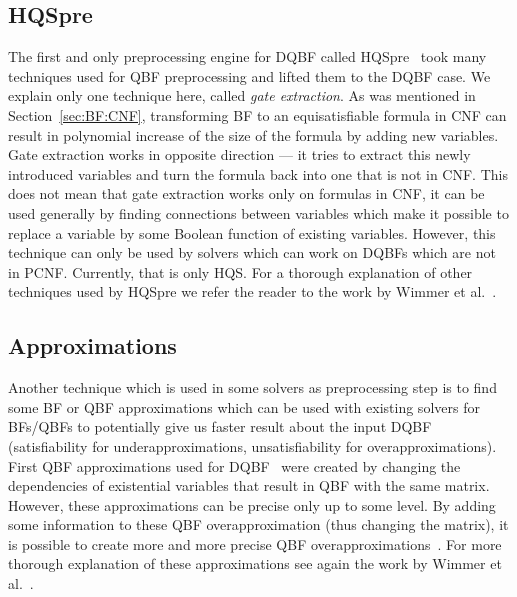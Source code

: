 \documentclass[
  digital, %
  color,
  twoside, %
  table,   %
  nolof,     %
  nolot,     %
]{fithesis3}
\theoremstyle{definition}
\theoremstyle{remark}
\begin{document}
\subsection{HQSpre}
\label{sec:HQSpre}
The first and only preprocessing engine for DQBF called HQSpre~\cite{HQSpre1,HQSpre2,HQSpreJournal} took many techniques used for QBF preprocessing and lifted them to the DQBF case. We explain only one technique here, called \emph{gate extraction}. As was mentioned in Section~\ref{sec:BF:CNF}, transforming BF to an equisatisfiable formula in CNF can result in polynomial increase of the size of the formula by adding new variables. Gate extraction works in opposite direction --- it tries to extract this newly introduced variables and turn the formula back into one that is not in CNF. This does not mean that gate extraction works only on formulas in CNF, it can be used generally by finding connections between variables which make it possible to replace a variable by some Boolean function of existing variables. However, this technique can only be used by solvers which can work on DQBFs which are not in PCNF. Currently, that is only HQS. For a thorough explanation of other techniques used by HQSpre we refer the reader to the work by Wimmer et al.~\cite{HQSpreJournal}. 

\subsection{Approximations}
\label{sec:prepro:approximations}
Another technique which is used in some solvers as preprocessing step is to find some BF or QBF approximations which can be used with existing solvers for BFs/QBFs to potentially give us faster result about the input DQBF (satisfiability for underapproximations, unsatisfiability for overapproximations). First QBF approximations used for DQBF~\cite{HQSsimpleAlg} were created by changing the dependencies of existential variables that result in QBF with the same matrix. However, these approximations can be precise only up to some level. By adding some information to these QBF overapproximation (thus changing the matrix), it is possible to create more and more precise QBF overapproximations~\cite{FastDQBFRefutation}. For more thorough explanation of these approximations see again the work by Wimmer et al.~\cite[Section~3]{HQSpreJournal}.
\end{document}
